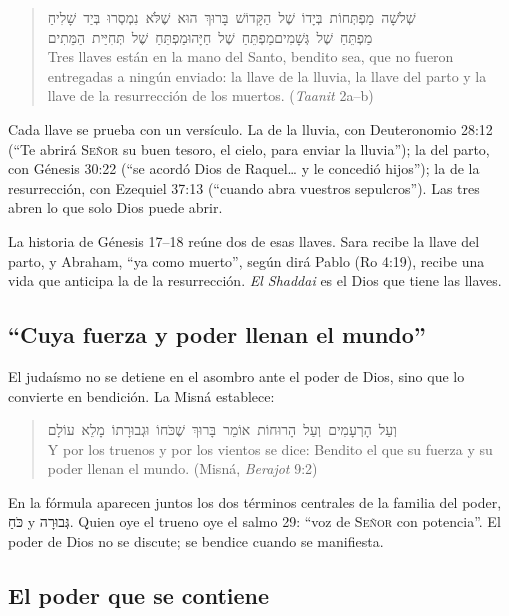 \documentclass[11pt,letterpaper]{article}
\newcommand{\heb}[1]{\mbox{\foreignlanguage{hebrew}{#1}}}
\newcommand{\SENOR}{\textsc{Señor}}
\begin{document}
\begin{quote}\small
\heb{שְׁלֹשָׁה מַפְתְּחוֹת בְּיָדוֹ שֶׁל הַקָּדוֹשׁ בָּרוּךְ הוּא שֶׁלֹּא נִמְסְרוּ בְּיַד שָׁלִיחַ}\\
\heb{מַפְתֵּחַ שֶׁל גְּשָׁמִים\quad מַפְתֵּחַ שֶׁל חַיָּה\quad וּמַפְתֵּחַ שֶׁל תְּחִיַּית הַמֵּתִים}\\
Tres llaves están en la mano del Santo, bendito sea, que no fueron entregadas a ningún enviado: la llave de la lluvia, la llave del parto y la llave de la resurrección de los muertos. (\emph{Taanit} 2a--b)
\end{quote}

Cada llave se prueba con un versículo. La de la lluvia, con Deuteronomio 28:12 (``Te abrirá \SENOR{} su buen tesoro, el cielo, para enviar la lluvia''); la del parto, con Génesis 30:22 (``se acordó Dios de Raquel\ldots{} y le concedió hijos''); la de la resurrección, con Ezequiel 37:13 (``cuando abra vuestros sepulcros''). Las tres abren lo que solo Dios puede abrir.

La historia de Génesis 17--18 reúne dos de esas llaves. Sara recibe la llave del parto, y Abraham, ``ya como muerto'', según dirá Pablo (Ro 4:19), recibe una vida que anticipa la de la resurrección. \emph{El Shaddai} es el Dios que tiene las llaves.

\subsection{``Cuya fuerza y poder llenan el mundo''}

El judaísmo no se detiene en el asombro ante el poder de Dios, sino que lo convierte en bendición. La Misná establece:

\begin{quote}\small
\heb{וְעַל הָרְעָמִים וְעַל הָרוּחוֹת אוֹמֵר בָּרוּךְ שֶׁכֹּחוֹ וּגְבוּרָתוֹ מָלֵא עוֹלָם}\\
Y por los truenos y por los vientos se dice: Bendito el que su fuerza y su poder llenan el mundo. (Misná, \emph{Berajot} 9:2)
\end{quote}

En la fórmula aparecen juntos los dos términos centrales de la familia del poder, \heb{כֹּחַ} y \heb{גְּבוּרָה}. Quien oye el trueno oye el salmo 29: ``voz de \SENOR{} con potencia''. El poder de Dios no se discute; se bendice cuando se manifiesta.

\subsection{El poder que se contiene}
\end{document}

